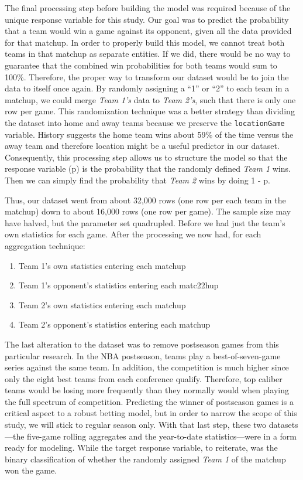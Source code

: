 \documentclass [MS] {uclathes}
\begin{document}
The final processing step before building the model was required because of the unique response variable for this study. Our goal was to predict the probability that a team would win a game against its opponent, given all the data provided for that matchup. In order to properly build this model, we cannot treat both teams in that matchup as separate entities. If we did, there would be no way to guarantee that the combined win probabilities for both teams would sum to 100\%. Therefore, the proper way to transform our dataset would be to join the data to itself once again. By randomly assigning a ``1'' or ``2'' to each team in a matchup, we could merge \emph{Team 1's} data to \emph{Team 2's}, such that there is only one row per game. This randomization technique was a better strategy than dividing the dataset into home and away teams because we preserve the \texttt{locationGame} variable. History suggests the home team wins about 59\% of the time versus the away team and therefore location might be a useful predictor in our dataset. Consequently, this processing step allows us to structure the model so that the response variable (p) is the probability that the randomly defined \emph{Team 1} wins. Then we can simply find the probability that \emph{Team 2} wins by doing 1 - p. 

Thus, our dataset went from about 32,000 rows (one row per each team in the matchup) down to about 16,000 rows (one row per game). The sample size may have halved, but the parameter set quadrupled. Before we had just the team's own statistics for each game. After the processing we now had, for each aggregation technique:

\begin{enumerate}
\item Team 1's own statistics entering each matchup
\item Team 1's opponent's statistics entering each matc22hup
\item Team 2's own statistics entering each matchup
\item Team 2's opponent's statistics entering each matchup
\end{enumerate}

The last alteration to the dataset was to remove postseason games from this particular research. In the NBA postseason, teams play a best-of-seven-game series against the same team. In addition, the competition is much higher since only the eight best teams from each conference qualify. Therefore, top caliber teams would be losing more frequently than they normally would when playing the full spectrum of competition. Predicting the winner of postseason games is a critical aspect to a robust betting model, but in order to narrow the scope of this study, we will stick to regular season only. With that last step, these two datasets---the five-game rolling aggregates and the year-to-date statistics---were in a form ready for modeling. While the target response variable, to reiterate, was the binary classification of whether the randomly assigned \emph{Team 1} of the matchup won the game. 
\end{document}
